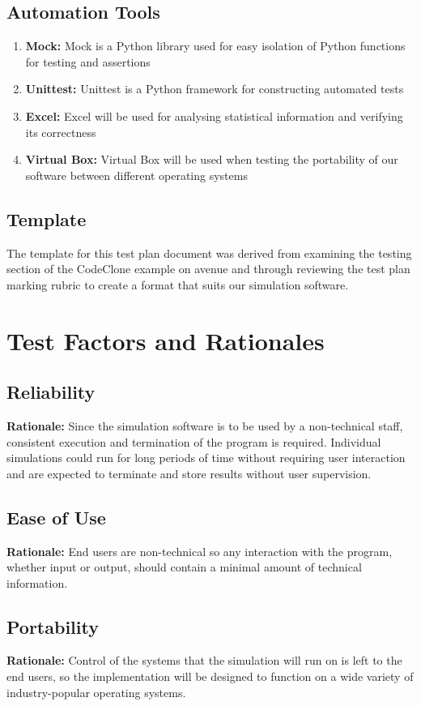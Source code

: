 \documentclass[paper=letter, fontsize=10pt]{scrartcl}
\numberwithin{equation}{section}		%
\numberwithin{figure}{section}			%
\numberwithin{table}{section}				%
\begin{document}
\subsection{Automation Tools}
\begin{enumerate}
	\item \textbf{Mock:} Mock is a Python library used for easy isolation of Python functions for testing and assertions
	\item \textbf{Unittest:} Unittest is a Python framework for constructing automated tests
	\item \textbf{Excel:} Excel will be used for analysing statistical information and verifying its correctness
	\item \textbf{Virtual Box:} Virtual Box will be used when testing the portability of our software between different operating systems
\end{enumerate}
\subsection{Template}
The template for this test plan document was derived from examining the testing section of the CodeClone example on avenue and through reviewing the test plan marking rubric to create a format that suits our simulation software.

\section{Test Factors and Rationales}
\subsection{Reliability}
\textbf{Rationale:} Since the simulation software is to be used by a non-technical staff, consistent execution and termination of the program is required. Individual simulations could run for long periods of time without requiring user interaction and are expected to terminate and store results without user supervision.
\subsection{Ease of Use}
\textbf{Rationale:} End users are non-technical so any interaction with the program, whether input or output, should contain a minimal amount of technical information.  
\subsection{Portability} 
\textbf{Rationale:} Control of the systems that the simulation will run on is left to the end users, so the implementation will be designed to function on a wide variety of industry-popular operating systems.
\end{document}
